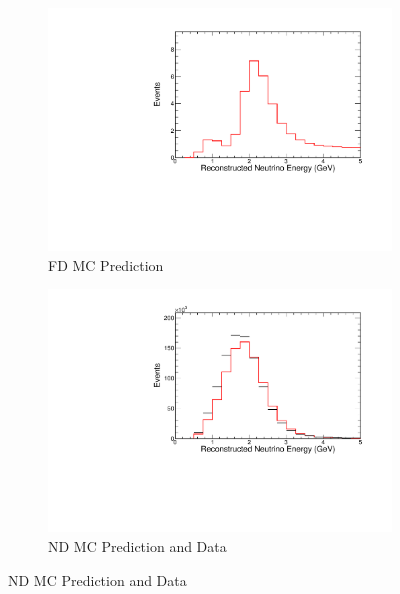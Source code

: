 {\begin{figure}
\end{figure}



\begin{figure}
\begin{center}
\begin{subfigure}[c]{0.49\textwidth}
\includegraphics[width=\textwidth]{figures/systs/prediction/fd_mc_prediction_massNormRel.pdf}
\caption*{FD MC Prediction}
\end{subfigure}
\begin{subfigure}[c]{0.49\textwidth}
\includegraphics[width=\textwidth]{figures/systs/prediction/nd_mc_prediction_massNormRel.pdf}
\caption*{ND MC Prediction and Data}
\end{subfigure}

\vspace{20pt}


\end{center}
\end{figure}}
